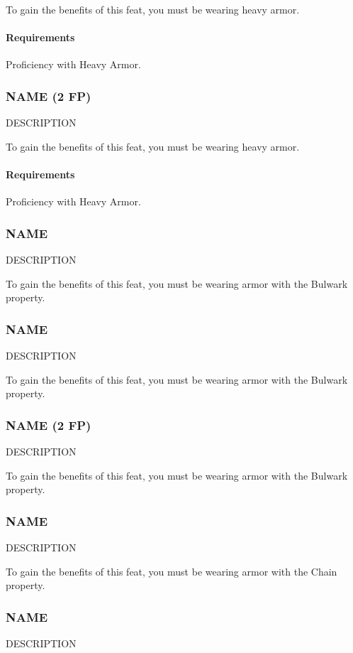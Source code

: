     To gain the benefits of this feat, you must be wearing heavy armor.
    \paragraph{Requirements} Proficiency with Heavy Armor.
\subsubsection{NAME (2 FP)} \label{feat::name}
    DESCRIPTION

    To gain the benefits of this feat, you must be wearing heavy armor.
    \paragraph{Requirements} Proficiency with Heavy Armor.

\subsubsection{NAME} \label{feat::name}
    DESCRIPTION

    To gain the benefits of this feat, you must be wearing armor with the Bulwark property.
\subsubsection{NAME} \label{feat::name}
    DESCRIPTION

    To gain the benefits of this feat, you must be wearing armor with the Bulwark property.
\subsubsection{NAME (2 FP)} \label{feat::name}
    DESCRIPTION

    To gain the benefits of this feat, you must be wearing armor with the Bulwark property.
\subsubsection{NAME} \label{feat::name}
    DESCRIPTION

    To gain the benefits of this feat, you must be wearing armor with the Chain property.
\subsubsection{NAME} \label{feat::name}
    DESCRIPTION

